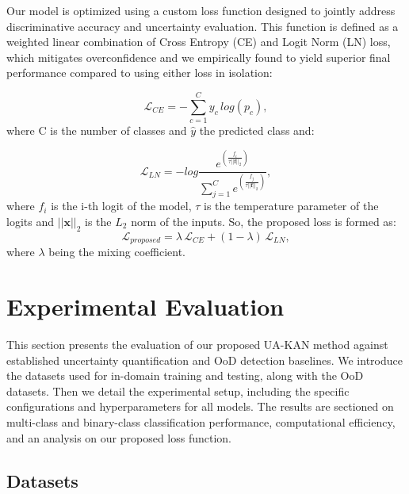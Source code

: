 \documentclass[conference]{IEEEtran}
\begin{document}
Our model is optimized using a custom loss function designed to jointly address discriminative accuracy and uncertainty evaluation. This function is defined as a weighted linear combination of Cross Entropy (CE) and Logit Norm (LN) loss, which mitigates overconfidence and we empirically found to yield superior final performance compared to using either loss in isolation:

\begin{equation} \label{eq:Categoricalcrossentr}
\mathcal{L}_{CE} = - \sum_{c=1}^{C}y_{c}\,log( p_{c}),
\end{equation}
where C is the number of classes and $\hat y$ the predicted class and:

\begin{equation} \label{eq:logitnormloss}
\mathcal{L}_{LN} = - log\frac{e^{(\frac{f_i}{\tau||\mathbf{f}||_2})}}{\sum_{j=1}^{C}e^{(\frac{f_j}{\tau||\mathbf{f}||_2})}},
\end{equation}
where $f_i$ is the i-th logit of the model, $\tau$ is the temperature parameter of the logits and $||\mathbf{x}||_2$ is the $L_2$ norm of the inputs. So, the proposed loss is formed as:
\begin{equation} \label{eq:proposedloss}
\mathcal{L}_{proposed} = \lambda \, \mathcal{L}_{CE} + (1-\lambda) \, \mathcal{L}_{LN},
\end{equation}
where $\lambda$ being the mixing coefficient.




\section{Experimental Evaluation}

This section presents the evaluation of our proposed UA-KAN method against established uncertainty quantification and OoD detection baselines. We introduce the datasets used for in-domain training and testing, along with the OoD datasets. Then we detail the experimental setup, including the specific configurations and hyperparameters for all models. The results are sectioned on multi-class and binary-class classification performance, computational efficiency, and an analysis on our proposed loss function. 










\subsection{Datasets}
\end{document}

